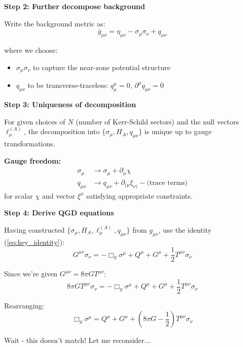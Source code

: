 \documentclass[11pt,a4paper]{article}
\theoremstyle{definition}
\theoremstyle{remark}
\begin{document}
		\textbf{Step 2: Further decompose background}
		
		Write the background metric as:
		\begin{equation}
			\bar{g}_{\mu\nu} = \eta_{\mu\nu} - \sigma_\mu\sigma_\nu + q_{\mu\nu}
		\end{equation}
		
		where we choose:
		\begin{itemize}
			\item $\sigma_\mu\sigma_\nu$ to capture the near-zone potential structure
			\item $q_{\mu\nu}$ to be transverse-traceless: $q^\mu_\mu = 0$, $\partial^\mu q_{\mu\nu} = 0$
		\end{itemize}
		
		\textbf{Step 3: Uniqueness of decomposition}
		
		For given choices of $N$ (number of Kerr-Schild sectors) and the null vectors $\ell_\mu^{(A)}$, the decomposition into $\{\sigma_\mu, H_A, q_{\mu\nu}\}$ is unique up to gauge transformations.
		
		\textbf{Gauge freedom:}
		\begin{align}
			\sigma_\mu &\to \sigma_\mu + \partial_\mu\chi\\
			q_{\mu\nu} &\to q_{\mu\nu} + \partial_{(\mu}\xi_{\nu)} - \text{(trace terms)}
		\end{align}
		for scalar $\chi$ and vector $\xi^\mu$ satisfying appropriate constraints.
		
		\textbf{Step 4: Derive QGD equations}
		
		Having constructed $\{\sigma_\mu, H_A, \ell_\mu^{(A)}, q_{\mu\nu}\}$ from $g_{\mu\nu}$, use the identity (\ref{eq:key_identity}):
		\begin{equation}
			G^{\mu\nu}\sigma_\nu = -\Box_g\sigma^\mu + Q^\mu + G^\mu + \frac{1}{2}T^{\mu\nu}\sigma_\nu
		\end{equation}
		
		Since we're given $G^{\mu\nu} = 8\pi G T^{\mu\nu}$:
		\begin{equation}
			8\pi G T^{\mu\nu}\sigma_\nu = -\Box_g\sigma^\mu + Q^\mu + G^\mu + \frac{1}{2}T^{\mu\nu}\sigma_\nu
		\end{equation}
		
		Rearranging:
		\begin{equation}
			\Box_g\sigma^\mu = Q^\mu + G^\mu + \left(8\pi G - \frac{1}{2}\right)T^{\mu\nu}\sigma_\nu
		\end{equation}
		
		Wait - this doesn't match! Let me reconsider...
		
\end{document}
